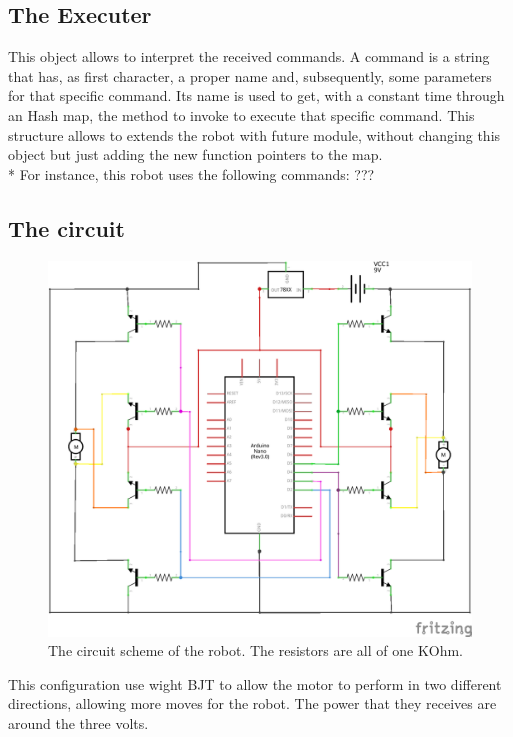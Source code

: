 \subsection{The Executer}
This object allows to interpret the received commands. A command is a string that has, as first character, a proper name and, subsequently, some parameters for that specific command. Its name is used to get, with a constant time through an Hash map, the method to invoke to execute that specific command. This structure allows to extends the robot with future module, without changing this object but just adding the new function pointers to the map.\\*
For instance, this robot uses the following commands:
???
\newpage

\subsection{The circuit}
\begin{figure}[h!]
	\centering
	\hspace*{-0.05 \textwidth}\includegraphics[width= 1.1\textwidth]
	{files/images/ReceiverScheme}
	\caption{The circuit scheme of the robot. The resistors are all of one KOhm.}
\end{figure}
This configuration use wight BJT to allow the motor to perform in two different directions, allowing more moves for the robot. The power that they receives are around the three volts.